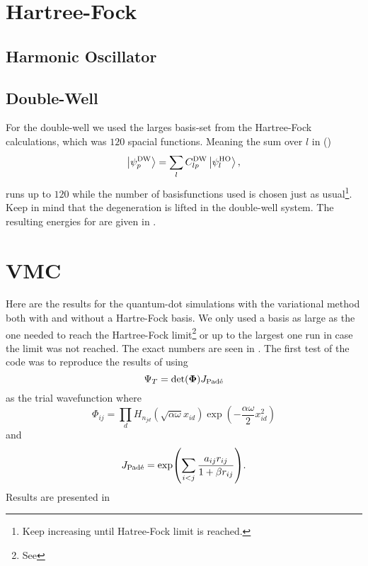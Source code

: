 \section{Hartree-Fock}
\subsection{Harmonic Oscillator}
    
    

\subsection{Double-Well\label{sec:dwbimp}}
    For the double-well we used the larges basis-set from the Hartree-Fock
    calculations, which was $120$ spacial functions. Meaning the sum over $l$
    in () 
        \begin{equation}
            \ket{\psi^{\text{DW}}_p} = \sum\limits_{l}C^{\text{DW}}_{lp}\ket{\psi^{\text{HO}}_l},
        \end{equation}
    runs up to $120$ while the number of
    basisfunctions used is chosen just as usual\footnote{Keep increasing until
    Hatree-Fock limit is reached.}. Keep in mind that the degeneration is
    lifted in the double-well system. The resulting energies for are given in
    .
    
    

\section{VMC}
    Here are the results for the quantum-dot simulations with the variational
    method both with and without a Hartre-Fock basis. We only used a basis as
    large as the one needed to reach the Hartree-Fock limit\footnote{See
    } or up to the largest one run in case the limit was not
    reached. The exact numbers are seen in . The
    first test of the code was to reproduce the results of \cite{jorgenThesis,
    hfrefarticle} using
        \begin{equation}
            \Psi_T = \text{det}(\boldsymbol{{\Phi}})J_{\text{Pad\'e}}
            \label{eq:benchtrialwave}
        \end{equation}
    as the trial wavefunction where
        \begin{equation}
            \Phi_{ij} = \prod_d
            H_{n_{jd}}\left(\sqrt{\alpha\omega}x_{id}\right)\exp(-\frac{\alpha\omega}{2}x^2_{id})
        \end{equation}
    and
        \begin{equation}
            J_{\text{Pad\'e}} = \exp(\sum\limits_{i<j} \frac{a_{ij}r_{ij}}{1+\beta
            r_{ij}}).
        \end{equation}
    Results are presented in 

